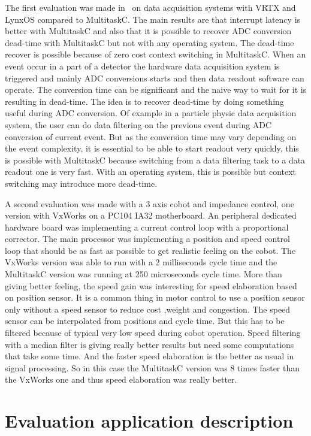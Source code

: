 \documentclass[10pt]{report}
\begin{document}
The first evaluation was made in~\cite{Delchini:95} on data acquisition systems with VRTX and LynxOS compared
to MultitaskC. The main results are that interrupt latency is better with MultitaskC and also that it is possible
to recover ADC conversion dead-time with MultitaskC but not with any operating system. The dead-time recover
is possible because of zero cost context switching in MultitaskC. When an event occur in a part of a detector
the hardware data acquisition system is triggered and mainly ADC conversions starts and then data readout
software can operate. The conversion time can be significant and the naive way to wait for it is resulting
in dead-time. The idea is to recover dead-time by doing something useful during ADC conversion. Of example
in a particle physic data acquisition system, the user can do data filtering on the previous event during
ADC conversion of current event. But as the conversion time may vary depending on the event complexity,
it is essential to be able to start readout very quickly, this is possible with MultitaskC because switching
from a data filtering task to a data readout one is very fast. With an operating system, this is possible
but context switching may introduce more dead-time.

A second evaluation was made with a 3 axis cobot and impedance control, one version with VxWorks on a PC104
IA32 motherboard. An peripheral dedicated hardware board was implementing a current control loop with a
proportional corrector. The main processor was implementing a position and speed control loop that should
be as fast as possible to get realistic feeling on the cobot. The VxWorks version was able to run with
a 2 milliseconds cycle time and the MultitaskC version was running at 250 microseconds cycle time. More than
giving better feeling, the speed gain was interesting for speed elaboration based on position sensor. It
is a common thing in motor control to use a position sensor only without a speed sensor to reduce cost
,weight and congestion. The speed sensor can be interpolated from positions and cycle time. But this has
to be filtered because of typical very low speed during cobot operation. Speed filtering with a median
filter is giving really better results but need some computations that take some time. And the faster
speed elaboration is the better as usual in signal processing. So in this case the MultitaskC version was
8 times faster than the VxWorks one and thus speed elaboration was really better.

\section{Evaluation application description}
\end{document}
